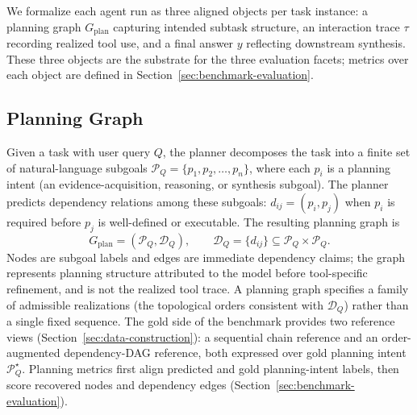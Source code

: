 \documentclass{article}
\begin{document}

We formalize each agent run as three aligned objects per task instance: a planning graph $G_{\text{plan}}$ capturing intended subtask structure, an interaction trace $\tau$ recording realized tool use, and a final answer $y$ reflecting downstream synthesis. These three objects are the substrate for the three evaluation facets; metrics over each object are defined in Section~\ref{sec:benchmark-evaluation}.

\subsection{Planning Graph}
Given a task with user query $Q$, the planner decomposes the task into a finite set of natural-language subgoals $\mathcal{P}_Q = \{p_1, p_2, \dots, p_n\}$, where each $p_i$ is a planning intent (an evidence-acquisition, reasoning, or synthesis subgoal). The planner predicts dependency relations among these subgoals: $d_{ij} = (p_i, p_j)$ when $p_i$ is required before $p_j$ is well-defined or executable. The resulting planning graph is
\[
G_{\text{plan}} = (\mathcal{P}_Q, \mathcal{D}_Q),
\qquad
\mathcal{D}_Q = \{d_{ij}\} \subseteq \mathcal{P}_Q \times \mathcal{P}_Q.
\]
Nodes are subgoal labels and edges are immediate dependency claims; the graph represents planning structure attributed to the model before tool-specific refinement, and is not the realized tool trace. A planning graph specifies a family of admissible realizations (the topological orders consistent with $\mathcal{D}_Q$) rather than a single fixed sequence. The gold side of the benchmark provides two reference views (Section~\ref{sec:data-construction}): a sequential chain reference and an order-augmented dependency-DAG reference, both expressed over gold planning intent $\mathcal{P}_Q^\star$. Planning metrics first align predicted and gold planning-intent labels, then score recovered nodes and dependency edges (Section~\ref{sec:benchmark-evaluation}).
\end{document}
